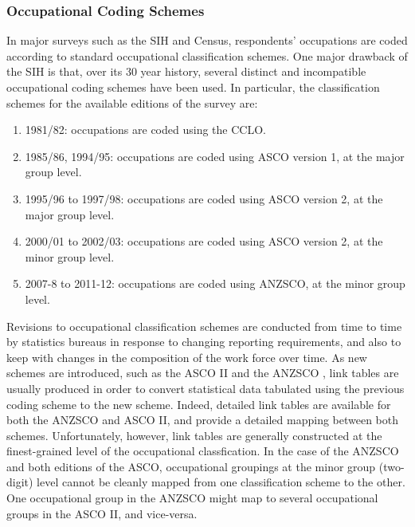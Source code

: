 \subsubsection{Occupational Coding Schemes}
\label{sec:occcoding}

In major surveys such as the SIH and Census, respondents' occupations are coded according to standard occupational classification schemes. One major drawback of the SIH is that, over its 30 year history, several distinct and incompatible occupational coding schemes have been used. In particular, the classification schemes for the available editions of the survey are:
\begin{enumerate}
\item 1981/82: occupations are coded using the CCLO.
\item 1985/86, 1994/95: occupations are coded using ASCO version 1, at the major group level.
\item 1995/96 to 1997/98: occupations are coded using ASCO version 2, at the major group level.
\item 2000/01 to 2002/03: occupations are coded using ASCO version 2, at the minor group level.
\item 2007-8 to 2011-12: occupations are coded using ANZSCO, at the minor group level.
\end{enumerate}
Revisions to occupational classification schemes are conducted from time to time by statistics bureaus in response to changing reporting requirements, and also to keep with changes in the composition of the work force over time. As new schemes are introduced, such as the ASCO II \citep{Castles1986} and the ANZSCO \citep{Trewin2006}, link tables are usually produced in order to convert statistical data tabulated using the previous coding scheme to the new scheme. Indeed, detailed link tables are available for both the ANZSCO and ASCO II, and provide a detailed mapping between both schemes. Unfortunately, however, link tables are generally constructed at the finest-grained level of the occupational classfication. In the case of the ANZSCO and both editions of the ASCO, occupational groupings at the minor group (two-digit) level cannot be cleanly mapped from one classification scheme to the other. One occupational group in the ANZSCO might map to several occupational groups in the ASCO II, and vice-versa.

